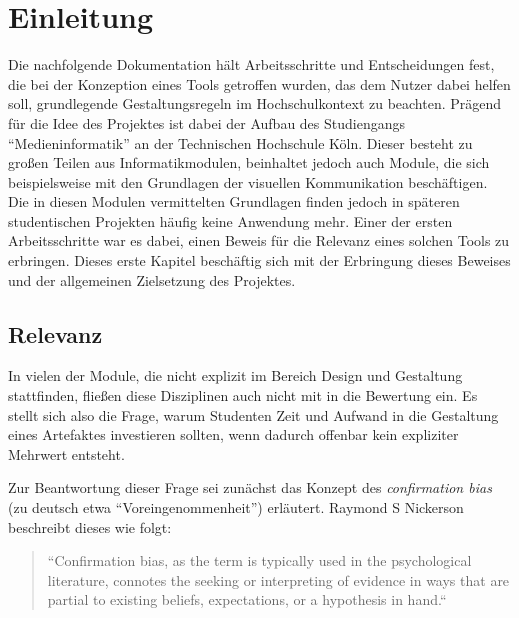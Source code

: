 
\chapter{Einleitung} %

\label{Einleitung} %


Die nachfolgende Dokumentation hält Arbeitsschritte und Entscheidungen fest, die bei der  Konzeption eines Tools getroffen wurden, das dem Nutzer dabei helfen soll, grundlegende Gestaltungsregeln im Hochschulkontext zu beachten.
Prägend für die Idee des Projektes ist dabei der Aufbau des Studiengangs “Medieninformatik” an der Technischen Hochschule Köln. Dieser besteht zu großen Teilen aus Informatikmodulen, beinhaltet jedoch auch Module, die sich beispielsweise mit den Grundlagen der visuellen Kommunikation beschäftigen. Die in diesen Modulen vermittelten Grundlagen finden jedoch in späteren studentischen Projekten häufig keine Anwendung mehr.
Einer der ersten Arbeitsschritte war es dabei, einen Beweis für die Relevanz eines solchen Tools zu erbringen. Dieses erste Kapitel beschäftig sich mit der Erbringung dieses Beweises und der allgemeinen Zielsetzung des Projektes.


\section{Relevanz}
In vielen der Module, die nicht explizit im Bereich Design und Gestaltung stattfinden, fließen diese Disziplinen auch nicht mit in die Bewertung ein. Es stellt sich also die Frage, warum Studenten Zeit und Aufwand in die Gestaltung eines Artefaktes investieren sollten, wenn dadurch offenbar kein expliziter Mehrwert entsteht.

Zur Beantwortung dieser Frage sei zunächst das Konzept des \textit{confirmation bias} (zu deutsch etwa “Voreingenommenheit”) erläutert. Raymond S Nickerson beschreibt dieses wie folgt:

\begin{quote}
“Confirmation bias, as the term is typically used in the psychological literature, connotes the seeking or interpreting of evidence in ways that are partial to existing beliefs, expectations, or a hypothesis in hand.“ \cite{nickerson1998confirmation}
\end{quote}


